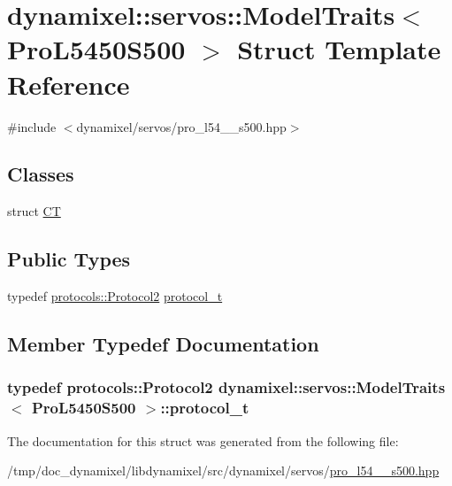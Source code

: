 \hypertarget{structdynamixel_1_1servos_1_1_model_traits_3_01_pro_l5450_s500_01_4}{}\section{dynamixel\+:\+:servos\+:\+:Model\+Traits$<$ Pro\+L5450\+S500 $>$ Struct Template Reference}
\label{structdynamixel_1_1servos_1_1_model_traits_3_01_pro_l5450_s500_01_4}


{\ttfamily \#include $<$dynamixel/servos/pro\+\_\+l54\+\_\+\_\+s500.\+hpp$>$}

\subsection*{Classes}
\begin{DoxyCompactItemize}
\item 
struct \hyperlink{structdynamixel_1_1servos_1_1_model_traits_3_01_pro_l5450_s500_01_4_1_1_c_t}{CT}
\end{DoxyCompactItemize}
\subsection*{Public Types}
\begin{DoxyCompactItemize}
\item 
typedef \hyperlink{classdynamixel_1_1protocols_1_1_protocol2}{protocols\+::\+Protocol2} \hyperlink{structdynamixel_1_1servos_1_1_model_traits_3_01_pro_l5450_s500_01_4_a7f0cf39c13edec9520e06dc4d36ee83f}{protocol\+\_\+t}
\end{DoxyCompactItemize}


\subsection{Member Typedef Documentation}
\subsubsection[{\texorpdfstring{protocol\+\_\+t}{protocol_t}}]{\setlength{\rightskip}{0pt plus 5cm}typedef {\bf protocols\+::\+Protocol2} {\bf dynamixel\+::servos\+::\+Model\+Traits}$<$ {\bf Pro\+L5450\+S500} $>$\+::{\bf protocol\+\_\+t}}\hypertarget{structdynamixel_1_1servos_1_1_model_traits_3_01_pro_l5450_s500_01_4_a7f0cf39c13edec9520e06dc4d36ee83f}{}\label{structdynamixel_1_1servos_1_1_model_traits_3_01_pro_l5450_s500_01_4_a7f0cf39c13edec9520e06dc4d36ee83f}


The documentation for this struct was generated from the following file\+:\begin{DoxyCompactItemize}
\item 
/tmp/doc\+\_\+dynamixel/libdynamixel/src/dynamixel/servos/\hyperlink{pro__l54__50__s500_8hpp}{pro\+\_\+l54\+\_\+\_\+s500.\+hpp}\end{DoxyCompactItemize}

